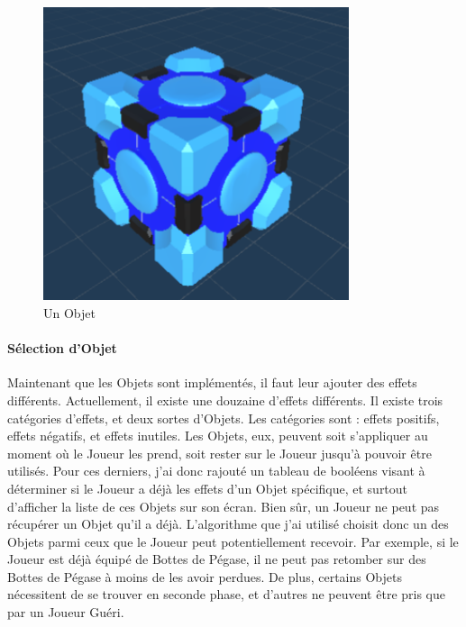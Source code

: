 \documentclass{article}
\begin{document}
\begin{figure}[H]
    \centering
    \includegraphics[width=0.8\textwidth]{Objet.png}
    \caption{Un Objet}
    \label{Un Objet}
\end{figure}

\paragraph{Sélection d'Objet}
Maintenant que les Objets sont implémentés, il faut leur ajouter des effets différents. Actuellement, il existe une douzaine d'effets différents. Il existe trois catégories d'effets, et deux sortes d'Objets. Les catégories sont : effets positifs, effets négatifs, et effets inutiles. Les Objets, eux, peuvent soit s'appliquer au moment où le Joueur les prend, soit rester sur le Joueur jusqu'à pouvoir être utilisés. Pour ces derniers, j'ai donc rajouté un tableau de booléens visant à déterminer si le Joueur a déjà les effets d'un Objet spécifique, et surtout d'afficher la liste de ces Objets sur son écran. Bien sûr, un Joueur ne peut pas récupérer un Objet qu'il a déjà. L'algorithme que j'ai utilisé choisit donc un des Objets parmi ceux que le Joueur peut potentiellement recevoir. Par exemple, si le Joueur est déjà équipé de Bottes de Pégase, il ne peut pas retomber sur des Bottes de Pégase à moins de les avoir perdues. De plus, certains Objets nécessitent de se trouver en seconde phase, et d'autres ne peuvent être pris que par un Joueur Guéri.
\end{document}
